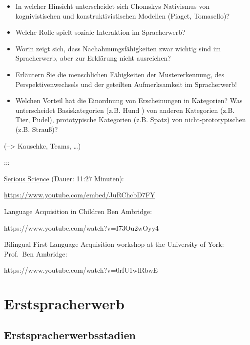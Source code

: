\documentclass[
  letterpaper,
]{scrbook}
\begin{document}
\begin{itemize}
\item
  In welcher Hinsicht unterscheidet sich Chomskys Nativismus von
  kognivistischen und konstruktivistischen Modellen (Piaget, Tomasello)?
\item
  Welche Rolle spielt soziale Interaktion im Spracherwerb?
\item
  Worin zeigt sich, dass Nachahmungsfähigkeiten zwar wichtig sind im
  Spracherwerb, aber zur Erklärung nicht ausreichen?
\item
  Erläutern Sie die menschlichen Fähigkeiten der Mustererkennung, des
  Perspektivenwechsels und der geteilten Aufmerksamkeit im Spracherwerb!
\item
  Welchen Vorteil hat die Einordnung von Erscheinungen in Kategorien?
  Was unterscheidet Basiskategorien (z.B. Hund ) von anderen Kategorien
  (z.B. Tier, Pudel), prototypische Kategorien (z.B. Spatz) von
  nicht-prototypischen (z.B. Strauß)?
\end{itemize}

(--\textgreater{} Kauschke, Teams, \ldots)

:::

\href{https://www.youtube.com/watch?v=JuRChcbD7FY}{Serious Science}
(Dauer: 11:27 Minuten):

\url{https://www.youtube.com/embed/JuRChcbD7FY}

Language Acquisition in Children Ben Ambridge:

https://www.youtube.com/watch?v=I73Ou2wOyy4

Bilingual First Language Acquisition workshop at the University of York:
Prof.~Ben Ambridge:

https://www.youtube.com/watch?v=0rfU1wlRbwE

\part{Erstspracherwerb}

\hypertarget{sec-stadien}{%
\chapter{Erstspracherwerbsstadien}\label{sec-stadien}}
\end{document}
